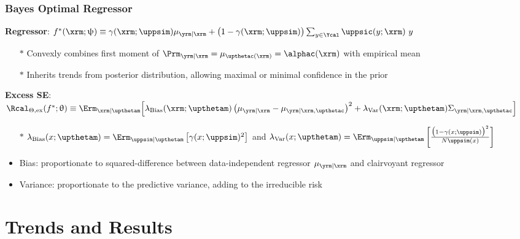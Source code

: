 \documentclass[aspectratio=169]{beamer}
\begin{document}
\begin{frame}
\frametitle{Bayes Optimal Regressor}

\textbf{Regressor}: $f^*(\xrm;\uppsi) \equiv \gamma(\xrm; \uppsim) \mu_{\yrm | \xrm} + \big(1-\gamma(\xrm; \uppsim)\big) \sum_{y \in \Ycal} \uppsic(y;\xrm) \ y$
\vspace{.5em}
\begin{itemize}
\item[$*$] Convexly combines first moment of $\Prm_{\yrm | \xrm} = \mu_{\upthetac(\xrm)} = \alphac(\xrm)$ with empirical mean 
\item[$*$] Inherits trends from posterior distribution, allowing maximal or minimal confidence in the prior
\end{itemize}

\hrulefill
\vspace{1.5em}

\textbf{Excess SE}: $\Rcal_{\Theta, \mathrm{ex}}(f^* ; \uptheta) \equiv \Erm_{\xrm | \upthetam}\Big[ \lambda_{\text{Bias}}(\xrm; \upthetam) \left( \mu_{\yrm | \xrm} - \mu_{\yrm | \xrm,\upthetac} \right)^2 + \lambda_{\text{Var}}(\xrm; \upthetam) \Sigma_{\yrm | \xrm,\upthetac} \Big]$
\begin{itemize}
\item[$*$] \footnotesize $\lambda_{\text{Bias}}(x; \upthetam) = \Erm_{\uppsim | \upthetam}\left[ \gamma(x; \uppsim)^2 \right]$ and $\lambda_{\text{Var}}(x; \upthetam) = \Erm_{\uppsim | \upthetam}\left[ \frac{\big( 1 - \gamma(x; \uppsim) \big)^2}{N \uppsim(x)} \right]$ \normalsize
\end{itemize}

\begin{itemize}
\item \alert{Bias}: proportionate to squared-difference between data-independent regressor $\mu_{\yrm | \xrm}$ and clairvoyant regressor
\item \alert{Variance}: proportionate to the predictive variance, adding to the irreducible risk
\end{itemize}

\end{frame}






\section{Trends and Results}
\end{document}
